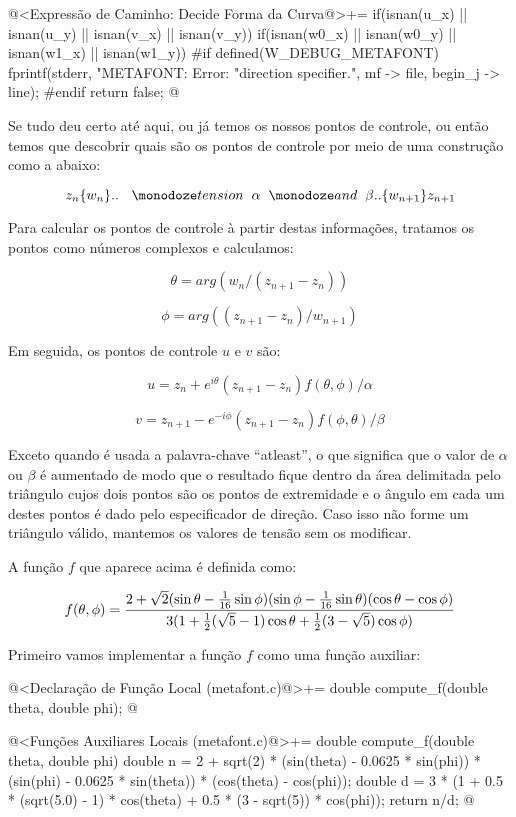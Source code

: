 {\iniciocodigo
@<Expressão de Caminho: Decide Forma da Curva@>+=
if(isnan(u_x) || isnan(u_y) || isnan(v_x) ||  isnan(v_y)){
  if(isnan(w0_x) || isnan(w0_y) || isnan(w1_x) || isnan(w1_y)){
#if defined(W_DEBUG_METAFONT)
    fprintf(stderr, "METAFONT: Error: %
                    "direction specifier.\n",  mf -> file, begin_j -> line);
#endif
    return false;
  }
}
@
\fimcodigo

Se tudo deu certo até aqui, ou já temos os nossos pontos de controle,
ou então temos que descobrir quais são os pontos de controle por meio
de uma construção como a abaixo:

$$
z_n\{w_n\}..\ {\hskip2mm \monoespaco{tension}\hskip2mm } \alpha {\hskip2mm \monoespaco{and}\hskip2mm } \beta .. \{w_{n+1}\}z_{n+1}
$$

Para calcular os pontos de controle à partir destas informações,
tratamos os pontos como números complexos e calculamos:

$$
\theta = arg(w_n/(z_{n+1}-z_n))
$$

$$
\phi = arg((z_{n+1}-z_n)/w_{n+1})
$$

Em seguida, os pontos de controle $u$ e $v$ são:

$$
u = z_{n} + e^{i\theta}(z_{n+1}-z_n)f(\theta, \phi)/\alpha
$$

$$
v = z_{n+1} - e^{-i\phi}(z_{n+1}-z_n)f(\phi, \theta)/\beta
$$

Exceto quando é usada a palavra-chave ``atleast'', o que significa que
o valor de $\alpha$ ou $\beta$ é aumentado de modo que o resultado
fique dentro da área delimitada pelo triângulo cujos dois pontos são
os pontos de extremidade e o ângulo em cada um destes pontos é dado
pelo especificador de direção. Caso isso não forme um triângulo
válido, mantemos os valores de tensão sem os modificar.

A função $f$ que aparece acima é definida como:

$$
f(\theta, \phi) = {{2+\sqrt{2}(\sin\theta-{{1}\over{16}}\sin\phi)(\sin\phi-{{1}\over{16}}\sin\theta)(\cos\theta-\cos\phi)}\over{3(1+{1\over 2}(\sqrt 5 - 1)\cos\theta+{1\over 2}(3-\sqrt 5)\cos\phi)}}
$$

Primeiro vamos implementar a função $f$ como uma função auxiliar:

\iniciocodigo
@<Declaração de Função Local (metafont.c)@>+=
double compute_f(double theta, double phi);
@
\fimcodigo

\iniciocodigo
@<Funções Auxiliares Locais (metafont.c)@>+=
double compute_f(double theta, double phi){
  double n = 2 + sqrt(2) * (sin(theta) - 0.0625 * sin(phi)) *
             (sin(phi) - 0.0625 * sin(theta)) * (cos(theta) - cos(phi));
  double d = 3 * (1 + 0.5 * (sqrt(5.0) - 1) * cos(theta) + 0.5 * (3 - sqrt(5)) *
                  cos(phi));
  return n/d;
}
@
\fimcodigo

}
